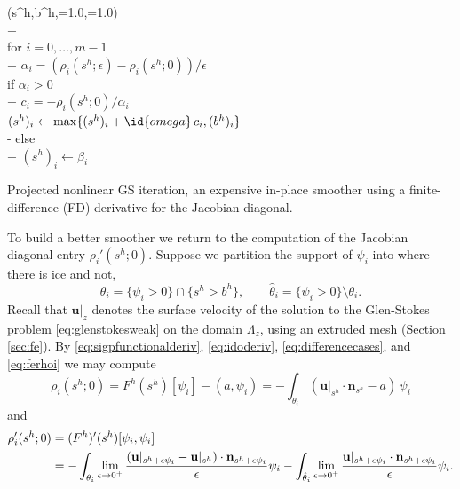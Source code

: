 \documentclass[letterpaper,final,12pt,reqno]{amsart}
\theoremstyle{claim}
\newcommand{\eps}{\epsilon}
\newcommand{\bn}{\mathbf{n}}
\newcommand{\bu}{\mathbf{u}}
\newcommand{\ip}[2]{\left(#1,#2\right)}
\numberwithin{equation}{section}
\numberwithin{figure}{section}
\numberwithin{table}{section}
\numberwithin{theorem}{section}
\begin{document}
\begin{pcode}[ht]
\begin{pseudo*}
(s^h,b^h,=1.0,=1.0)\text{:} \\+
     \\
    for $i = 0,\dots,m-1$ \\+
        $\alpha_i = (\rho_i(s^h; \eps) - \rho_i(s^h; 0))/\eps$  \qquad\qquad {} \\
        if $\alpha_i > 0$ \\+
            $c_i = - \rho_i(s^h; 0) / \alpha_i$ \\
            $(s^h)_i \gets \max\{(s^h)_i + \id{omega}\,c_i, (b^h)_i\}$ \\-
        else \\+
            $(s^h)_i \gets \beta_i$ \qquad\qquad {}
\end{pseudo*}
\caption{Projected nonlinear GS iteration, an expensive in-place smoother using a finite-difference (FD) derivative for the Jacobian diagonal.}
\label{pc:pngsslow}
\end{pcode}

To build a better smoother we return to the computation of the Jacobian diagonal entry $\rho_i'(s^h; 0)$.  Suppose we partition the support of $\psi_i$ into where there is ice and not,
\begin{equation}
\theta_i = \{\psi_i > 0\} \cap \{s^h > b^h\}, \qquad {\hat\theta}_i = \{\psi_i > 0\} \setminus \theta_i.  \label{eq:thetasupport}
\end{equation}
Recall that $\bu|_{z}$ denotes the surface velocity of the solution to the Glen-Stokes problem \eqref{eq:glenstokesweak} on the domain $\Lambda_{z}$, using an extruded mesh (Section \ref{sec:fe}).  By \eqref{eq:sigpfunctionalderiv}, \eqref{eq:idoderiv}, \eqref{eq:differencecases}, and \eqref{eq:ferhoi} we may compute
\begin{equation}
\rho_i(s^h; 0) = F^h(s^h)[\psi_i] - \ip{a}{\psi_i} = - \int_{\theta_i} (\bu|_{s^h} \cdot \bn_{s^h}- a)\, \psi_i  \label{eq:rhozero}
\end{equation}
and
\begin{align}
\rho_i'(s^h; 0) &= (F^h)'(s^h)[\psi_i,\psi_i]  \label{eq:rholocalderiv} \\
  &= - \int_{\theta_i} \lim_{\eps\to 0^+} \frac{(\bu|_{s^h+\eps\psi_i} - \bu|_{s^h}) \cdot \bn_{s^h+\eps\psi_i}}{\eps} \psi_i - \int_{{\hat\theta}_i} \lim_{\eps\to 0^+} \frac{\bu|_{s^h+\eps\psi_i} \cdot \bn_{s^h+\eps\psi_i}}{\eps} \psi_i.  \notag
\end{align}
\end{document}
